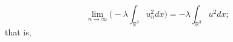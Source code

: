 \[ \label{4.43}
\lim_{n\to\infty}\Big(-\lambda \int_{\mathbb{R}^3} {u^2_n} dx\Big)
=-\lambda \int_{\mathbb{R}^3} {u^2} dx;
\]
that is,
